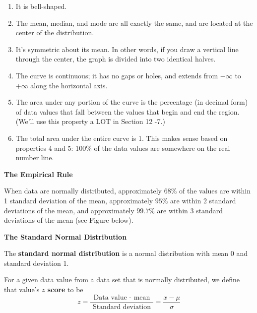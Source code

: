 \documentclass[12pt]{gWmaths}
\begin{document}
\begin{enumerate}[1.]
\item It is bell-shaped.
\item The mean, median, and mode are all exactly the same, and are located at the center of the distribution.
\item It's symmetric about its mean. In other words, if you draw a vertical line through the center, the graph is divided into two identical halves.
\item The curve is continuous; it has no gaps or holes, and extends from $-\infty$ to $+\infty$ along the horizontal axis.
\item The area under any portion of the curve is the percentage (in decimal form) of data values that fall between the values that begin and end the region. (We'll use this property a LOT in Section 12 -7.)
\item The total area under the entire curve is 1. This makes sense based on properties 4 and 5: $100\%$ of the data values are somewhere on the real number line.
\end{enumerate}

\vspace{1 in}

\noindent
\textbf{The Empirical Rule}\\

\begin{Def}
When data are normally distributed, approximately $68\%$ of the values are within 1 standard deviation of the mean, approximately $95\%$ are within 2 standard deviations of the mean, and approximately $99.7\%$ are within 3 standard deviations of the mean (see Figure below).\\
\end{Def}




\noindent
\textbf{The Standard Normal Distribution}\\

\begin{Def}
The \textbf{standard normal distribution} is a normal distribution with mean 0 and standard deviation 1. \\
\end{Def}


\noindent
For a given data value from a data set that is normally distributed, we define that value's \textbf{$z$ score} to be\\ $$z = \frac{\text{ Data value - mean } }{\text{ Standard deviation }} = \frac{x - \mu}{\sigma}$$ \\
\end{document}
